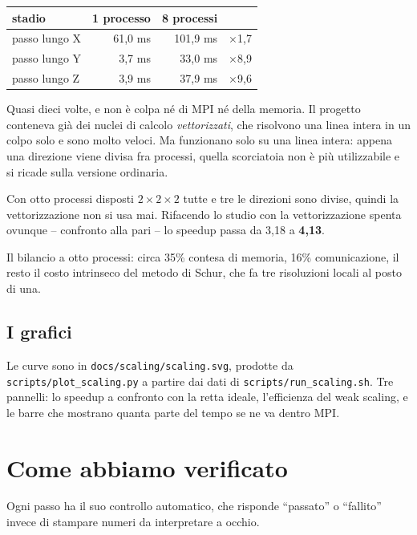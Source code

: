 \documentclass[11pt,a4paper]{article}
\newcommand{\cd}[1]{\texttt{\small #1}}
\begin{document}
\begin{center}
\begin{tabular}{@{}lrrr@{}}
\toprule
\textbf{stadio} & \textbf{1 processo} & \textbf{8 processi} & \\
\midrule
passo lungo X & 61{,}0 ms & 101{,}9 ms & $\times$1{,}7 \\
passo lungo Y &  3{,}7 ms &  33{,}0 ms & $\times$8{,}9 \\
passo lungo Z &  3{,}9 ms &  37{,}9 ms & $\times$9{,}6 \\
\bottomrule
\end{tabular}
\end{center}

\medskip
Quasi dieci volte, e non è colpa né di MPI né della memoria. Il progetto
conteneva già dei nuclei di calcolo \emph{vettorizzati}, che risolvono una
linea intera in un colpo solo e sono molto veloci. Ma funzionano solo su una
linea intera: appena una direzione viene divisa fra processi, quella scorciatoia
non è più utilizzabile e si ricade sulla versione ordinaria.

Con otto processi disposti $2\times2\times2$ tutte e tre le direzioni sono
divise, quindi la vettorizzazione non si usa mai. Rifacendo lo studio con la
vettorizzazione spenta ovunque -- confronto alla pari -- lo speedup passa da
3{,}18 a \textbf{4{,}13}.

\medskip
Il bilancio a otto processi: circa 35\% contesa di memoria, 16\% comunicazione,
il resto il costo intrinseco del metodo di Schur, che fa tre risoluzioni locali
al posto di una.

\subsection*{I grafici}

Le curve sono in \cd{docs/scaling/scaling.svg}, prodotte da
\cd{scripts/plot\_scaling.py} a partire dai dati di
\cd{scripts/run\_scaling.sh}. Tre pannelli: lo speedup a confronto con la retta
ideale, l'efficienza del weak scaling, e le barre che mostrano quanta parte del
tempo se ne va dentro MPI.

\section{Come abbiamo verificato}

Ogni passo ha il suo controllo automatico, che risponde ``passato'' o
``fallito'' invece di stampare numeri da interpretare a occhio.
\end{document}
